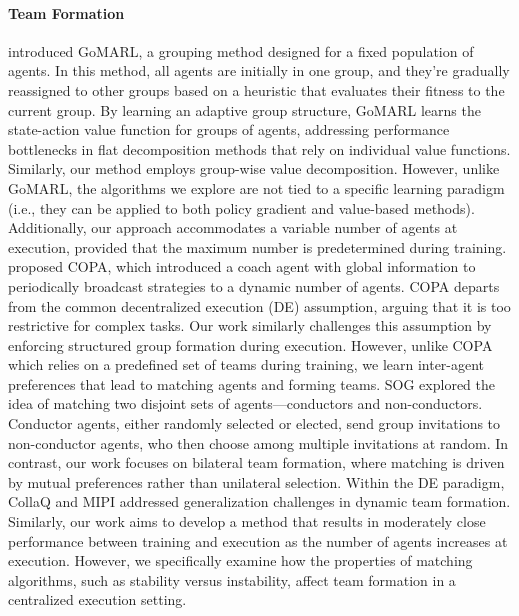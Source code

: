 \documentclass[10pt]{article} %
\begin{document}
\paragraph{Team Formation} \citet{zang2024automatic} introduced GoMARL, a grouping method designed for a fixed population of agents. In this method, all agents are initially in one group, and they're gradually reassigned to other groups based on a heuristic that evaluates their fitness to the current group. By learning an adaptive group structure, GoMARL learns the state-action value function for groups of agents, addressing performance bottlenecks in flat decomposition methods that rely on individual value functions. Similarly, our method employs group-wise value decomposition. However, unlike GoMARL, the algorithms we explore are not tied to a specific learning paradigm (i.e., they can be applied to both policy gradient and value-based methods). Additionally, our approach accommodates a variable number of agents at execution, provided that the maximum number is predetermined during training. 
\citet{liu2021coach} proposed COPA, which introduced a coach agent with global information to periodically broadcast strategies to a dynamic number of agents. COPA departs from the common decentralized execution (DE) assumption, arguing that it is too restrictive for complex tasks. Our work similarly challenges this assumption by enforcing structured group formation during execution. However, unlike COPA which relies on a predefined set of teams during training, we learn inter-agent preferences that lead to matching agents and forming teams.
SOG \citep{shao2022self} explored the idea of matching two disjoint sets of agents—conductors and non-conductors. Conductor agents, either randomly selected or elected, send group invitations to non-conductor agents, who then choose among multiple invitations at random. In contrast, our work focuses on bilateral team formation, where matching is driven by mutual preferences rather than unilateral selection. Within the DE paradigm, CollaQ \citep{zhang2020multi} and MIPI \citep{ye2024mutual} addressed generalization challenges in dynamic team formation.  Similarly, our work aims to develop a method that results in moderately close performance between training and execution as the number of agents increases at execution. However, we specifically examine how the properties of matching algorithms, such as stability versus instability, affect team formation in a centralized execution setting.
\end{document}
